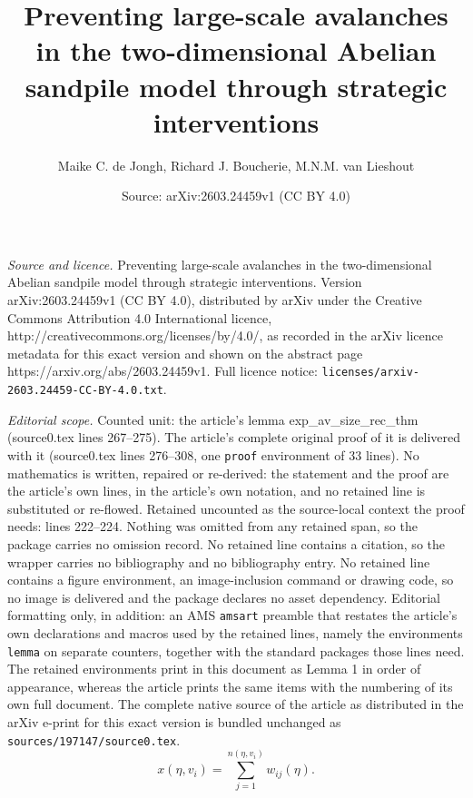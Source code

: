 \documentclass[10pt,a4paper]{amsart}
\title{Preventing large-scale avalanches in the two-dimensional Abelian sandpile model through strategic interventions}
\author{Maike C. de Jongh, Richard J. Boucherie, M.N.M. van Lieshout}
\date{Source: arXiv:2603.24459v1 (CC BY 4.0)}
\begin{document}
\maketitle

\noindent\emph{Source and licence.} Preventing large-scale avalanches in the two-dimensional Abelian sandpile model through strategic interventions. Version arXiv:2603.24459v1 (CC BY 4.0), distributed by arXiv under the Creative Commons Attribution 4.0 International licence, http://creativecommons.org/licenses/by/4.0/, as recorded in the arXiv licence metadata for this exact version and shown on the abstract page https://arxiv.org/abs/2603.24459v1. Full licence notice: \texttt{licenses/arxiv-2603.24459-CC-BY-4.0.txt}.\par\smallskip

\noindent\textit{Editorial scope.} Counted unit: the article's lemma exp\_av\_size\_rec\_thm (source0.tex lines 267--275). The article's complete original proof of it is delivered with it (source0.tex lines 276--308, one \texttt{proof} environment of 33 lines). No mathematics is written, repaired or re-derived: the statement and the proof are the article's own lines, in the article's own notation, and no retained line is substituted or re-flowed.  Retained uncounted as the source-local context the proof needs: lines 222--224.  Nothing was omitted from any retained span, so the package carries no omission record.  No retained line contains a citation, so the wrapper carries no bibliography and no bibliography entry.  No retained line contains a figure environment, an image-inclusion command or drawing code, so no image is delivered and the package declares no asset dependency.  Editorial formatting only, in addition: an AMS \texttt{amsart} preamble that restates the article's own declarations and macros used by the retained lines, namely the environments \texttt{lemma} on separate counters, together with the standard packages those lines need.  The retained environments print in this document as Lemma 1 in order of appearance, whereas the article prints the same items with the numbering of its own full document.  The complete native source of the article as distributed in the arXiv e-print for this exact version is bundled unchanged as \texttt{sources/197147/source0.tex}.
\begin{equation}\label{sum_of_waves}
    x(\eta, v_i) = \sum\limits_{j = 1}^{n(\eta, v_i)} w_{ij}(\eta).
\end{equation}
\end{document}

